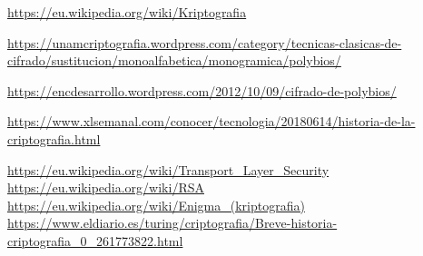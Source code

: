 \documentclass[12pt]{basque-book}
\begin{document}
\begin{thebibliography}{}
\bibitem{}\url{https://eu.wikipedia.org/wiki/Kriptografia}

\bibitem{}\url{https://unamcriptografia.wordpress.com/category/tecnicas-clasicas-de-cifrado/sustitucion/monoalfabetica/monogramica/polybios/}

\bibitem{}\url{https://encdesarrollo.wordpress.com/2012/10/09/cifrado-de-polybios/}

\bibitem{}\url{https://www.xlsemanal.com/conocer/tecnologia/20180614/historia-de-la-criptografia.html}

\bibitem{}\url{https://eu.wikipedia.org/wiki/Transport_Layer_Security}
\bibitem{}\url{https://eu.wikipedia.org/wiki/RSA}
\bibitem{}\url{https://eu.wikipedia.org/wiki/Enigma_(kriptografia)}
\bibitem{}\url{https://www.eldiario.es/turing/criptografia/Breve-historia-criptografia_0_261773822.html}


\end{thebibliography}
\end{document}
